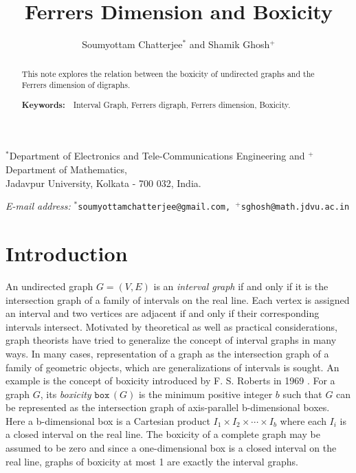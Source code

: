 \documentclass[11pt]{article}
\title{\Large\bf Ferrers Dimension and Boxicity}
\author{Soumyottam Chatterjee$^{*}$ and Shamik Ghosh$^{+}$}
\renewcommand{\baselinestretch}{1.25}
\theoremstyle{definition}
\theoremstyle{remark}
\numberwithin{equation}{section}
\newcommand{\address}[1]
 { \vspace{-2em}\begin{center}
  \footnotesize{#1}
   \end{center}}
\newcommand{\email}[1]
   {\vspace{-2em} \begin{center}
   \footnotesize{{\it E-mail address:} \texttt{#1}}
   \end{center}}
\newcommand{\BOX}[1]{\texttt{box}\,(#1)}
\begin{document}
\maketitle

\vspace{-0.5em}
\address{$^{*}$Department of Electronics and Tele-Communications Engineering and $^{+}$Department of Mathematics,\\
Jadavpur University,
Kolkata - 700 032, India.}

\vspace{0.25em}
\email{$^{*}$soumyottamchatterjee@gmail.com, $^{+}$sghosh@math.jdvu.ac.in}



\renewcommand{\baselinestretch}{1}
\begin{abstract}
This note explores the relation between the boxicity of undirected graphs and the Ferrers dimension of digraphs.

\vspace{0.5em}\noindent
{\footnotesize {\bf Keywords:}\ \ Interval Graph, Ferrers digraph, Ferrers dimension, Boxicity.}
\end{abstract}



\renewcommand{\baselinestretch}{1.25}



\section{Introduction}

An undirected graph $G = (V, E)$ is an {\em interval graph} if and only if it is the intersection graph of a family of intervals on the real line. Each vertex is assigned an interval and two vertices are adjacent if and only if their corresponding intervals intersect. Motivated by theoretical as well as practical considerations, graph theorists have tried to generalize the concept of interval graphs in many ways. In many cases, representation of a graph as the intersection graph of a family of geometric objects, which are generalizations of intervals is sought. An example is the concept of boxicity introduced by F. S. Roberts in 1969 \cite{F}. For a graph $G$, its {\em boxicity} $\BOX{G}$ is the minimum positive integer $b$ such that $G$ can be represented as the intersection graph of axis-parallel b-dimensional boxes. Here a b-dimensional box is a Cartesian product $I_1\times I_2\times\cdots\times I_b$ where each $I_i$ is a closed interval on the real line. The boxicity of a complete graph may be assumed to be zero and since a one-dimensional box is a closed interval on the real line, graphs of boxicity at most 1 are exactly the interval graphs.
\end{document}
